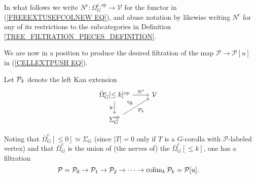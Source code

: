 \documentclass[a4paper,10pt]{article}%
\begin{document}


In what follows we write $N^e \colon \Omega_G^{e,op} \to \mathcal{V}$ for the functor in (\ref{FREEEXTUSEFCOLNEW EQ}),
and abuse notation by likewise writing $N^e$ for any of its restrictions to the subcategories in 
Definition \ref{TREE_FILTRATION_PIECES_DEFINITION}.

We are now in a position to produce the desired filtration of the map $\mathcal{P} \to \mathcal{P}[u]$ in 
(\ref{CELLEXTPUSH EQ}).

\begin{definition}
  \label{PK_DEFN}
  Let $\P_k$ denote the left Kan extension
  \[
  \begin{tikzcd}
    |[alias=U]| \bar{\Omega}_G^e[\leq k]^{op} \arrow[r, "N^e"] \arrow[d, "\mathsf{lr}"'] & \V
    \\
    \Sigma_G^{op} \arrow[ur, "\P_k"', ""{name=V}]
    \arrow[Rightarrow, from=U, to=V]
  \end{tikzcd}
  \]
\end{definition}
Noting that $\bar{\Omega}_G^e[\leq 0] \simeq \Sigma_G$ (since $|T|=0$ only if $T$ is a $G$-corolla with $\mathcal{P}$-labeled vertex) and that $\bar{\Omega}_G^e$
is the union of (the nerves of) the 
$\bar{\Omega}_G^e[\leq k]$, one has a filtration
\begin{equation}\label{FILT EQ}
  \mathcal{P} = 
  \mathcal{P}_0 \to 
  \mathcal{P}_1 \to
  \mathcal{P}_2 \to
  \cdots \to 
  \colim_k \mathcal{P}_k = \mathcal{P}[u].
\end{equation}
\end{document}
